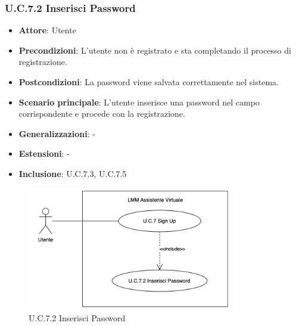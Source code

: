 \subsubsection{U.C.7.2 Inserisci Password}
\begin{itemize}
    \item \textbf{Attore}: Utente
    \item \textbf{Precondizioni}: L'utente non è registrato e sta completando il processo di registrazione.
    \item \textbf{Postcondizioni}: La password viene salvata correttamente nel sistema.
    \item \textbf{Scenario principale}: L'utente inserisce una password nel campo corrispondente e procede con la registrazione. 
    \item \textbf{Generalizzazioni}: -
    \item \textbf{Estensioni}: -
    \item \textbf{Inclusione}: U.C.7.3, U.C.7.5
\end{itemize}
\begin{figure}[H]
    \centering
    \includegraphics[width=0.8\textwidth]{img/UC7.2.png}
    \caption{U.C.7.2 Inserisci Password}
\end{figure}
\newpage

